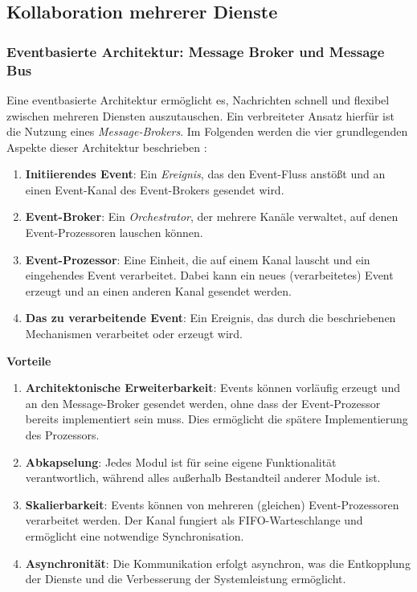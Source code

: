 \subsection{Kollaboration mehrerer Dienste}

\subsubsection{Eventbasierte Architektur: Message Broker und Message Bus} \label{cha:grundlagen:swdesign:kollab:msgbus}

Eine eventbasierte Architektur ermöglicht es, Nachrichten schnell und flexibel zwischen mehreren Diensten auszutauschen. Ein verbreiteter Ansatz hierfür ist die Nutzung eines \textit{Message-Brokers}. Im Folgenden werden die vier grundlegenden Aspekte dieser Architektur beschrieben \autocite{oreilly:mod-swarch}:
\begin{enumerate}
    \item \textbf{Initiierendes Event}: Ein \textit{Ereignis}, das den Event-Fluss anstößt und an einen Event-Kanal des Event-Brokers gesendet wird.
    \item \textbf{Event-Broker}: Ein \textit{Orchestrator}, der mehrere Kanäle verwaltet, auf denen Event-Prozessoren lauschen können.
    \item \textbf{Event-Prozessor}: Eine Einheit, die auf einem Kanal lauscht und ein eingehendes Event verarbeitet. Dabei kann ein neues (verarbeitetes) Event erzeugt und an einen anderen Kanal gesendet werden.
    \item \textbf{Das zu verarbeitende Event}: Ein Ereignis, das durch die beschriebenen Mechanismen verarbeitet oder erzeugt wird.
\end{enumerate}

\textbf{Vorteile}

\begin{enumerate}
    \item \textbf{Architektonische Erweiterbarkeit}: Events können vorläufig erzeugt und an den Message-Broker gesendet werden, ohne dass der Event-Prozessor bereits implementiert sein muss. Dies ermöglicht die spätere Implementierung des Prozessors.
    \item \textbf{Abkapselung}: Jedes Modul ist für seine eigene Funktionalität verantwortlich, während alles außerhalb Bestandteil anderer Module ist.
    \item \textbf{Skalierbarkeit}: Events können von mehreren (gleichen) Event-Prozessoren verarbeitet werden. Der Kanal fungiert als FIFO-Warteschlange und ermöglicht eine notwendige Synchronisation.
    \item \textbf{Asynchronität}: Die Kommunikation erfolgt asynchron, was die Entkopplung der Dienste und die Verbesserung der Systemleistung ermöglicht.
\end{enumerate}

